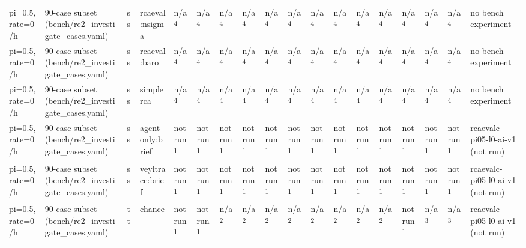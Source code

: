 \begin{table}[t]
\begin{tabular}{llllllllllllllllll}
pi=0.5, rate=0/h & 90-case subset (bench/re2\_investigate\_cases.yaml) & ss & rcaeval:nsigma & n/a\textsuperscript{4} & n/a\textsuperscript{4} & n/a\textsuperscript{4} & n/a\textsuperscript{4} & n/a\textsuperscript{4} & n/a\textsuperscript{4} & n/a\textsuperscript{4} & n/a\textsuperscript{4} & n/a\textsuperscript{4} & n/a\textsuperscript{4} & n/a\textsuperscript{4} & n/a\textsuperscript{4} & n/a\textsuperscript{4} & no bench experiment \\
pi=0.5, rate=0/h & 90-case subset (bench/re2\_investigate\_cases.yaml) & ss & rcaeval:baro & n/a\textsuperscript{4} & n/a\textsuperscript{4} & n/a\textsuperscript{4} & n/a\textsuperscript{4} & n/a\textsuperscript{4} & n/a\textsuperscript{4} & n/a\textsuperscript{4} & n/a\textsuperscript{4} & n/a\textsuperscript{4} & n/a\textsuperscript{4} & n/a\textsuperscript{4} & n/a\textsuperscript{4} & n/a\textsuperscript{4} & no bench experiment \\
pi=0.5, rate=0/h & 90-case subset (bench/re2\_investigate\_cases.yaml) & ss & simplerca & n/a\textsuperscript{4} & n/a\textsuperscript{4} & n/a\textsuperscript{4} & n/a\textsuperscript{4} & n/a\textsuperscript{4} & n/a\textsuperscript{4} & n/a\textsuperscript{4} & n/a\textsuperscript{4} & n/a\textsuperscript{4} & n/a\textsuperscript{4} & n/a\textsuperscript{4} & n/a\textsuperscript{4} & n/a\textsuperscript{4} & no bench experiment \\
pi=0.5, rate=0/h & 90-case subset (bench/re2\_investigate\_cases.yaml) & ss & agent-only:brief & not run\textsuperscript{1} & not run\textsuperscript{1} & not run\textsuperscript{1} & not run\textsuperscript{1} & not run\textsuperscript{1} & not run\textsuperscript{1} & not run\textsuperscript{1} & not run\textsuperscript{1} & not run\textsuperscript{1} & not run\textsuperscript{1} & not run\textsuperscript{1} & not run\textsuperscript{1} & not run\textsuperscript{1} & rcaevalc-pi05-l0-ai-v1 (not run) \\
pi=0.5, rate=0/h & 90-case subset (bench/re2\_investigate\_cases.yaml) & ss & veyltrace:brief & not run\textsuperscript{1} & not run\textsuperscript{1} & not run\textsuperscript{1} & not run\textsuperscript{1} & not run\textsuperscript{1} & not run\textsuperscript{1} & not run\textsuperscript{1} & not run\textsuperscript{1} & not run\textsuperscript{1} & not run\textsuperscript{1} & not run\textsuperscript{1} & not run\textsuperscript{1} & not run\textsuperscript{1} & rcaevalc-pi05-l0-ai-v1 (not run) \\
pi=0.5, rate=0/h & 90-case subset (bench/re2\_investigate\_cases.yaml) & tt & chance & not run\textsuperscript{1} & not run\textsuperscript{1} & n/a\textsuperscript{2} & n/a\textsuperscript{2} & n/a\textsuperscript{2} & n/a\textsuperscript{2} & n/a\textsuperscript{2} & n/a\textsuperscript{2} & n/a\textsuperscript{2} & n/a\textsuperscript{2} & not run\textsuperscript{1} & n/a\textsuperscript{3} & n/a\textsuperscript{3} & rcaevalc-pi05-l0-ai-v1 (not run) \\

\end{tabular}
\end{table}
